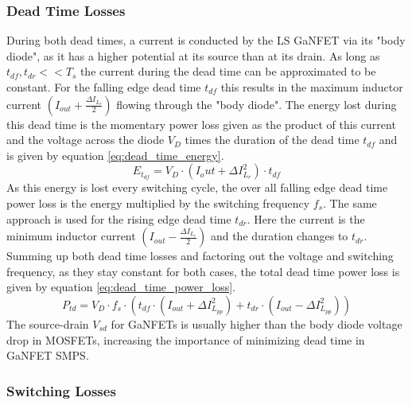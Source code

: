 \subsubsection{Dead Time Losses}
During both dead times, a current is conducted by the \ac{LS} \ac{GaNFET} via its "body diode", as it has a higher potential at its source than at its drain. As long as $t_{df}, t_{dr} << T_s$ the current during the dead time can be approximated to be constant. For the falling edge dead time $t_{df}$ this results in the maximum inductor current $(I_{out}+\frac{\Delta I_{L_r}}{2})$ flowing through the "body diode". The energy lost during this dead time is the momentary power loss given as the product of this current and the voltage across the diode $V_D$ times the duration of the dead time $t_{df}$ and is given by equation \ref{eq:dead_time_energy}. 
\begin{equation}\label{eq:dead_time_energy}
    E_{t_{df}} = V_D \cdot (I_out + \Delta I_{L_r}^2) \cdot t_{df}
\end{equation}
As this energy is lost every switching cycle, the over all falling edge dead time power loss is the energy multiplied by the switching frequency $f_s$. The same approach is used for the rising edge dead time $t_{dr}$. Here the current is the minimum inductor current $(I_{out}-\frac{\Delta I_{L_r}}{2})$ and the duration changes to $t_{dr}$. Summing up both dead time losses and factoring out the voltage and switching frequency, as they stay constant for both cases, the total dead time power loss is given by equation \ref{eq:dead_time_power_loss}.
\begin{equation}\label{eq:dead_time_power_loss}
P_{td} = V_D \cdot f_s \cdot \left(t_{df} \cdot \left(I_{out} + \Delta I_{L_{pp}}^2\right) + t_{dr} \cdot \left(I_{out} - \Delta I_{L_{pp}}^2\right)\right)    
\end{equation}
The source-drain $V_{sd}$ for \acp{GaNFET} is usually higher than the body diode voltage drop in \acp{MOSFET}, increasing the importance of minimizing dead time in \ac{GaNFET} \ac{SMPS}. \\

\subsubsection{Switching Losses}

